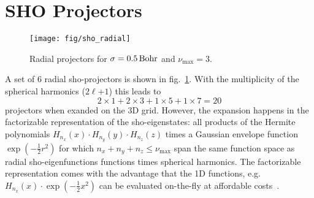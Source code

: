 \documentclass[oribibl]{llncs}
\newcommand{\um}[1]{_{\mathrm{#1}}}
\begin{document}
\section{SHO Projectors}

%
\begin{figure}
  \begin{minipage}[c]{.990\textwidth}
	\texttt{[image: fig/sho\_radial]} %
  \end{minipage}\hfill
  \begin{minipage}[c]{.009\textwidth}
  \end{minipage}
  \label{fig:sho-radial-projectors}
  \caption{
  Radial projectors for $\sigma = \unit[0.5]{Bohr}$ and $\nu\um{max} = 3$.
  }
\end{figure}
%
%
A set of $6$ radial \ac{sho}-projectors is shown in fig.~\ref{fig:sho-radial-projectors}.
With the multiplicity of the spherical harmonics ($2\ell$+$1$) this leads to 
$$2 \times 1 + 2 \times 3 + 1 \times 5 + 1 \times 7 = 20$$
projectors when exanded on the 3D grid.
However, the expansion happens in the factorizable representation of the
\ac{sho}-eigenstates: all products of the Hermite polynomials 
$H_{n_x}(x) \cdot H_{n_y}(y) \cdot H_{n_z}(z)$ 
times a Gaussian envelope function $\exp(-\frac12 r^2)$
for which $n_x + n_y + n_z \leq \nu\um{max}$ span the same function space
as radial \ac{sho}-eigenfunctions functions times spherical harmonics.
The factorizable representation comes with the advantage that the 1D functions,
e.g.~$H_{n_x}(x) \cdot \exp(-\frac 12 x^2)$ can be evaluated on-the-fly 
at affordable costs~\cite{BaumeisterTsukamotoPASC19}.

 
\end{document}
